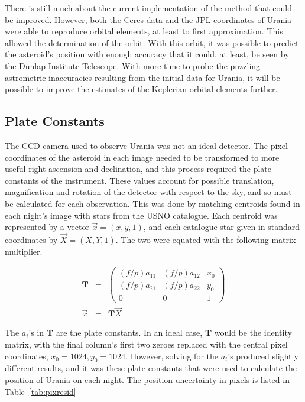 \documentclass[a4paper,12pt]{article}
\begin{document}
There is still much about the current implementation of the method that could be improved. However, both the Ceres data and the JPL coordinates of Urania were able to reproduce orbital elements, at least to first approximation. This allowed the determination of the orbit. With this orbit, it was possible to predict the asteroid's position with enough accuracy that it could, at least, be seen by the Dunlap Institute Telescope. With more time to probe the puzzling astrometric inaccuracies resulting from the initial data for Urania, it will be possible to improve the estimates of the Keplerian orbital elements further. 




\begin{appendices}
\section{Plate Constants}
\label{app:plate}

The CCD camera used to observe Urania was not an ideal detector. The pixel coordinates of the asteroid in each image needed to be transformed to more useful right ascension and declination, and this process required the plate constants of the instrument. These values account for possible translation, magnification and rotation of the detector with respect to the sky, and so must be calculated for each observation. This was done by matching centroids found in each night's image with stars from the USNO catalogue. Each centroid was represented by a vector $\vec{x} = (x,y,1)$, and each catalogue star given in standard coordinates by $\vec{X} = (X,Y,1)$. The two were equated with the following matrix multiplier.

\begin{eqnarray}
\mathbf{T} &=& \begin{pmatrix}
(f/p)a_{11}& (f/p)a_{12}& x_{0}\\
(f/p)a_{21}& (f/p)a_{22}& y_{0}\\
0& 0& 1
\end{pmatrix}\nonumber\\
\vec{x} &=& \mathbf{T}\vec{X}\nonumber
\label{eqn:transform}
\end{eqnarray}

The $a_{i}$'s in $\mathbf{T}$ are the plate constants. In an ideal case, $\mathbf{T}$ would be the identity matrix, with the final column's first two zeroes replaced with the central pixel coordinates, $x_{0} = 1024, y_{0} = 1024$. However, solving for the $a_{i}$'s produced slightly different results, and it was these plate constants that were used to calculate the position of Urania on each night. The position uncertainty in pixels is listed in Table~\ref{tab:pixresid}


\end{appendices}
\end{document}
